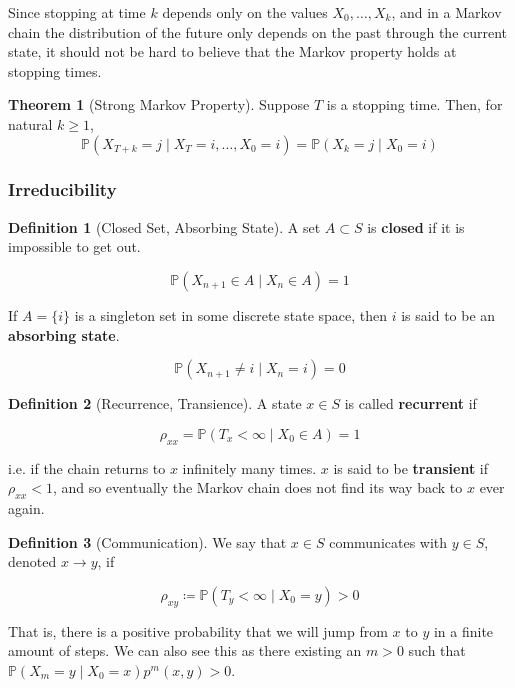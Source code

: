 \documentclass{article}
\theoremstyle{definition}
\newtheorem{theorem}{Theorem}[section]
\theoremstyle{remark}
\theoremstyle{definition}
\newtheorem{definition}{Definition}[section]
\begin{document}
      Since stopping at time $k$ depends only on the values $X_0, \ldots, X_k$, and in a Markov chain the distribution of the future only depends on the past through the current state, it should not be hard to believe that the Markov property holds at stopping times. 

      \begin{theorem}[Strong Markov Property]
        Suppose $T$ is a stopping time. Then, for natural $k \geq 1$, 
          \[\mathbb{P}(X_{T + k} = j \mid X_T = i, \ldots, X_0 = i) = \mathbb{P}(X_k = j \mid X_0 = i) \]
      \end{theorem}

    \subsubsection{Irreducibility}

      \begin{definition}[Closed Set, Absorbing State]
        A set $A \subset S$ is \textbf{closed} if it is impossible to get out. 

          \[\mathbb{P}(X_{n + 1} \in A \mid X_n \in A) = 1\]

        If $A = \{i\}$ is a singleton set in some discrete state space, then $i$ is said to be an \textbf{absorbing state}. 

          \[\mathbb{P}(X_{n+1} \neq i \; | \; X_n = i) = 0\]
      \end{definition}

      \begin{definition}[Recurrence, Transience]
        A state $x \in S$ is called \textbf{recurrent} if 

          \[\rho_{xx} = \mathbb{P}(T_x < \infty \mid X_0 \in A) = 1\]

        i.e. if the chain returns to $x$ infinitely many times. $x$ is said to be \textbf{transient} if $\rho_{xx} < 1$, and so eventually the Markov chain does not find its way back to $x$ ever again. 
      \end{definition}

      \begin{definition}[Communication]
        We say that $x \in S$ communicates with $y \in S$, denoted $x \rightarrow y$, if 

          \[\rho_{xy} \coloneqq \mathbb{P}(T_y < \infty \mid X_0 = y) > 0\]

        That is, there is a positive probability that we will jump from $x$ to $y$ in a finite amount of steps. We can also see this as there existing an $m > 0$ such that $\mathbb{P}(X_m = y \mid X_0 = x) p^m (x, y) > 0$. 
      \end{definition}
\end{document}

